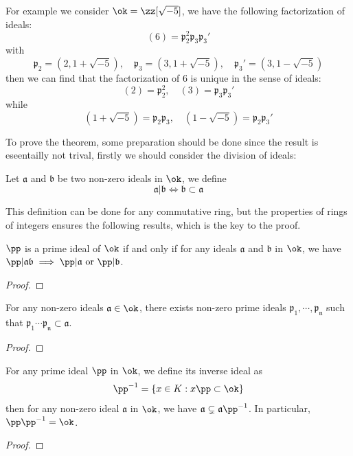 For example we consider \(\ok = \zz[\sqrt{-5}]\), we have the following factorization of ideals:
\[(6) = \mathfrak{p}_2^2 \mathfrak{p}_3 \mathfrak{p}_3'\]
with \[\mathfrak{p_2} = (2,1+\sqrt{-5}),\quad \mathfrak{p_3} = (3,1+\sqrt{-5}),\quad \mathfrak{p_3'} = (3,1-\sqrt{-5})\]
then we can find that the factorization of \(6\) is unique in the sense of ideals:
\[(2) = \mathfrak{p}_2^2 , \quad (3) = \mathfrak{p}_3 \mathfrak{p}_3'\]
while
\[(1+\sqrt{-5}) = \mathfrak{p}_2 \mathfrak{p}_3 ,\quad (1-\sqrt{-5}) = \mathfrak{p}_2 \mathfrak{p}_3'\]

To prove the theorem, some preparation should be done since the result is eseentailly not trival, firstly we should consider the division of ideals:

\begin{definition}
    Let \(\mathfrak{a}\) and \(\mathfrak{b}\) be two non-zero ideals in \(\ok\), we define 
    \[\mathfrak{a} | \mathfrak{b} \iff \mathfrak{b} \subset \mathfrak{a}\]
\end{definition}

This definition can be done for any commutative ring, but the properties of rings of integers ensures the following results, which is the key to the proof.

\begin{lemma}
    \(\pp\) is a prime ideal of \(\ok\) if and only if for any ideals \(\mathfrak{a}\) and \(\mathfrak{b}\) in \(\ok\), we have \(\pp | \mathfrak{a}\mathfrak{b} \implies \pp | \mathfrak{a} \text{ or } \pp | \mathfrak{b}\).
\end{lemma}
\begin{proof}
    
\end{proof}

\begin{lemma}
    For any non-zero ideals \(\mathfrak{a} \in \ok\), there exists non-zero prime ideals \(\mathfrak{p_1},\cdots,\mathfrak{p_n}\) such that \( \mathfrak{p_1}\cdots\mathfrak{p_n} \subset \mathfrak{a}\). 
\end{lemma}

\begin{proof}
    
\end{proof}

\begin{lemma} \label{lemma2forfract}
    For any prime ideal \(\pp\) in \(\ok\), we define its inverse ideal as \[\pp^{-1} = \{x \in K : x\pp \subset \ok\}\]
then for any non-zero ideal \(\mathfrak{a}\) in \(\ok\), we have \(\mathfrak{a}\subsetneq \mathfrak{a}\pp^{-1} \). In particular, \(\pp\pp^{-1} = \ok\).
\end{lemma}
\begin{proof}
    
\end{proof}

